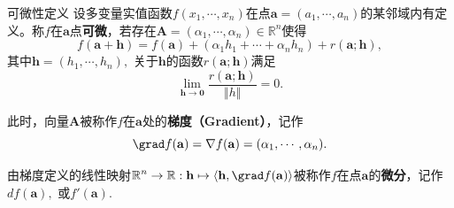 \begin{frame}

\begin{block}{可微性定义}
设多变量实值函数$f(x_1,\cdots,x_n)$在点$\mathbf{a} = (a_1,\cdots,a_n)$的某邻域内有定义。称$f$在$\mathbf{a}$点{\bfseries 可微}，若存在$\mathbf{A} = (\alpha_1,\cdots,\alpha_n) \in \mathbb{R}^n$使得
$$f(\mathbf{a} + \mathbf{h}) = f(\mathbf{a}) + (\alpha_1h_1+\cdots+\alpha_nh_n) + r(\mathbf{a};\mathbf{h}),$$
其中$\mathbf{h} = (h_1,\cdots,h_n),$ 关于$\mathbf{h}$的函数$r(\mathbf{a};\mathbf{h})$满足
$$\lim\limits_{\mathbf{h}\to\mathbf{0}} \dfrac{r(\mathbf{a};\mathbf{h})}{\Vert h\Vert} = 0.$$

\pause

此时，向量$\mathbf{A}$被称作$f$在$\mathbf{a}$处的{\bfseries 梯度（Gradient）}，记作
$$\grad f(\mathbf{a}) = \nabla f(\mathbf{a}) = (\alpha_1,\cdots,\alpha_n).$$

\pause

由梯度定义的线性映射\(\displaystyle\mathbb{R}^n \to \mathbb{R}: \mathbf{h} \mapsto \langle \mathbf{h}, \grad f(\mathbf{a}) \rangle\)被称作$f$在点$\mathbf{a}$的{\bfseries 微分}，记作$df(\mathbf{a}),$ 或$f'(\mathbf{a}).$
\end{block}

\end{frame}








